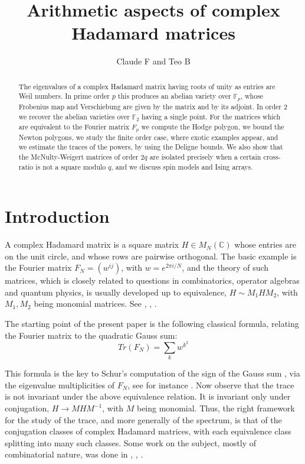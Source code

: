 \documentclass[11pt]{amsart}
\theoremstyle{definition}
\begin{document}
\title[Complex Hadamard matrices]{Arithmetic aspects of complex Hadamard matrices}

\author{Claude F and Teo B}


\begin{abstract}
The eigenvalues of a complex Hadamard matrix having roots of unity as entries are Weil numbers. In prime order $p$ this produces an abelian variety over $\mathbb F_p$, whose Frobenius map and Verschiebung are given by the matrix and by its adjoint. In order 2 we recover the abelian varieties over $\mathbb F_2$ having a single point. For the matrices which are equivalent to the Fourier matrix $F_p$ we compute the Hodge polygon, we bound the Newton polygons, we study the finite order case, where exotic examples appear, and we estimate the traces of the powers, by using the Deligne bounds. We also show that the McNulty-Weigert matrices of order $2q$ are isolated precisely when a certain cross-ratio is not a square modulo $q$, and we discuss spin models and Ising arrays.
\end{abstract}

\maketitle

{\baselineskip=11pt \tableofcontents}

\section*{Introduction}

A complex Hadamard matrix is a square matrix $H\in M_N(\mathbb C)$ whose entries are on the unit circle, and whose rows are pairwise orthogonal. The basic example is the Fourier matrix $F_N=(w^{ij})$, with $w=e^{2\pi i/N}$, and the theory of such matrices, which is closely related to questions in combinatorics, operator algebras and quantum physics, is usually developed up to equivalence, $H\sim M_1HM_2$, with $M_1,M_2$ being monomial matrices. See \cite{but}, \cite{haa}, \cite{tzy}.

\medskip

The starting point of the present paper is the following classical formula, relating the Fourier matrix to the quadratic Gauss sum:
$$Tr(F_N)=\sum_kw^{k^2}$$

This formula is the key to Schur's computation of the sign of the Gauss sum \cite{sch}, via the eigenvalue multiplicities of $F_N$, see for instance \cite{ba1}. Now observe that the trace is not invariant under the above equivalence relation. It is invariant only under conjugation, $H\to MHM^{-1}$, with $M$ being monomial. Thus, the right framework for the study of the trace, and more generally of the spectrum, is that of the conjugation classes of complex Hadamard matrices, with each equivalence class splitting into many such classes. Some work on the subject, mostly of combinatorial nature, was done in \cite{dhw}, \cite{eoc}, \cite{eos}.
\end{document}
